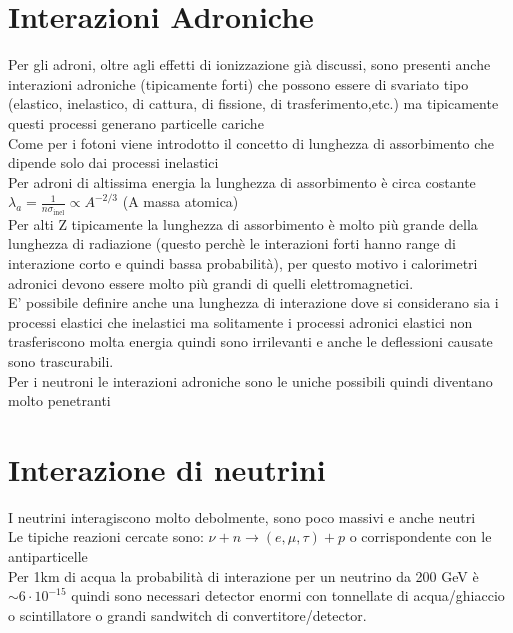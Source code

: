 \section{Interazioni Adroniche}
Per gli adroni, oltre agli effetti di ionizzazione già discussi, sono presenti anche interazioni adroniche (tipicamente forti) che possono essere di svariato tipo (elastico, inelastico, di cattura, di fissione, di trasferimento,etc.) ma tipicamente questi processi generano particelle cariche
\\
Come per i fotoni viene introdotto il concetto di lunghezza di assorbimento che dipende solo dai processi inelastici
\\
Per adroni di altissima energia la lunghezza di assorbimento è circa costante $\lambda_a=\frac{1}{n\sigma_{\text{inel}}} \propto A^{-2/3}$ (A massa atomica)
\\
Per alti Z tipicamente la lunghezza di assorbimento è molto più grande della lunghezza di radiazione (questo perchè le interazioni forti hanno range di interazione corto e quindi bassa probabilità), per questo motivo i calorimetri adronici devono essere molto più grandi di quelli elettromagnetici.
\\
E' possibile definire anche una lunghezza di interazione dove si considerano sia i processi elastici che inelastici ma solitamente i processi adronici elastici non trasferiscono molta energia quindi sono irrilevanti e anche le deflessioni causate sono trascurabili.
\\
Per i neutroni le interazioni adroniche sono le uniche possibili quindi diventano molto penetranti
\section{Interazione di neutrini}
I neutrini interagiscono molto debolmente, sono poco massivi e anche neutri
\\
Le tipiche reazioni cercate sono:
$\nu+n \to (e,\mu,\tau) +p$ o corrispondente con le antiparticelle
\\
Per 1km di acqua la probabilità di interazione per un neutrino da 200 GeV è $\sim 6 \cdot 10^{-15}$ quindi sono necessari detector enormi con tonnellate di acqua/ghiaccio o scintillatore o grandi sandwitch di convertitore/detector.